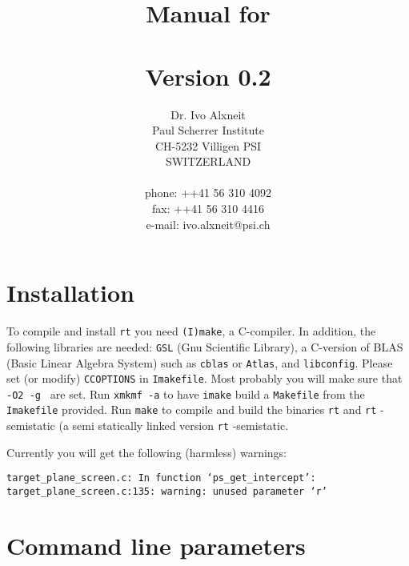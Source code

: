 \documentclass[10pt,a4paper,titlepage]{article}
\title{ {\Huge Manual for \\
		\rt \\
		Version 0.2\\
		\vspace{2cm}}}
\author{Dr. Ivo Alxneit \\
	Paul Scherrer Institute \\
	CH-5232 Villigen PSI \\
	SWITZERLAND \\
	\\
	phone: ++41 56 310 4092 \\
	fax: ++41 56 310 4416 \\
	e-mail: ivo.alxneit@psi.ch \\
	\vspace{4cm}}
\newcommand{\rt}{{\tt rt} }
\begin{document}
\maketitle

\tableofcontents
\pagebreak

\setcounter{page}{1}



\section{Installation}

To compile and install \rt you need {\tt (I)make}, a C-compiler. In addition, the following libraries are needed: {\tt GSL} (Gnu Scientific Library), a C-version of BLAS (Basic Linear Algebra System) such as {\tt cblas} or {\tt Atlas}, and {\tt libconfig}. Please set (or modify) {\tt CCOPTIONS} in {\tt Imakefile}. Most probably you will make sure that {\tt -O2 -g } are set. Run {\tt xmkmf -a} to have {\tt imake} build a {\tt Makefile} from the {\tt Imakefile} provided. Run {\tt make} to compile and build the binaries \rt and {\rt-semistatic} (a semi statically linked version {\rt-semistatic}.

Currently you will get the following (harmless) warnings:

\begin{verbatim}
target_plane_screen.c: In function ‘ps_get_intercept’:
target_plane_screen.c:135: warning: unused parameter ‘r’
\end{verbatim}



\section{Command line parameters}
\end{document}
